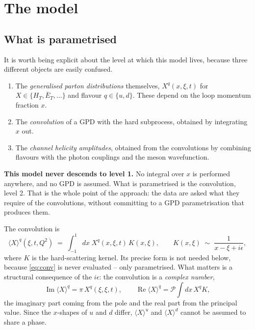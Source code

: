 
\section{The model}

\subsection{What is parametrised}

It is worth being explicit about the level at which this model lives, because
three different objects are easily confused.

\begin{enumerate}
\item The \emph{generalised parton distributions} themselves,
      $X^q(x,\xi,t)$ for $X \in \{H_T, \bar E_T, \dots\}$ and flavour
      $q \in \{u,d\}$.  These depend on the loop momentum fraction $x$.
\item The \emph{convolution} of a GPD with the hard subprocess,
      obtained by integrating $x$ out.
\item The \emph{channel helicity amplitudes}, obtained from the convolutions
      by combining flavours with the photon couplings and the meson
      wavefunction.
\end{enumerate}

\textbf{This model never descends to level 1.}  No integral over $x$ is
performed anywhere, and no GPD is assumed.  What is parametrised is the
convolution, level 2.  That is the whole point of the approach: the data are
asked what they require of the convolutions, without committing to a GPD
parametrisation that produces them.

The convolution is
\begin{equation}
\langle X\rangle^q(\xi,t,Q^2) \;=\;
\int_{-1}^{1}\! dx \; X^q(x,\xi,t)\, K(x,\xi),
\qquad
K(x,\xi) \;\sim\; \frac{1}{x-\xi+i\epsilon},
\label{eq:conv}
\end{equation}
where $K$ is the hard-scattering kernel.  Its precise form is not needed
below, because \eqref{eq:conv} is never evaluated -- only parametrised.  What
matters is a structural consequence of the $i\epsilon$: the convolution is a
\emph{complex number},
\begin{equation}
\operatorname{Im}\langle X\rangle^q = \pi\, X^q(\xi,\xi,t),
\qquad
\operatorname{Re}\langle X\rangle^q = \mathcal{P}\!\!\int\! dx\, X^q K ,
\label{eq:reim}
\end{equation}
the imaginary part coming from the pole and the real part from the principal
value.  Since the $x$-shapes of $u$ and $d$ differ, $\langle X\rangle^u$ and
$\langle X\rangle^d$ cannot be assumed to share a phase.

